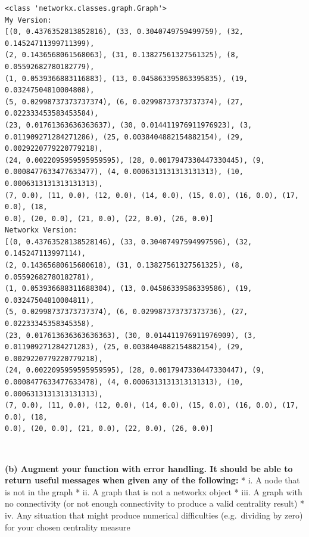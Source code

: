 \documentclass[11pt]{article}
\begin{document}
    \begin{Verbatim}[commandchars=\\\{\}]
<class 'networkx.classes.graph.Graph'>
My Version:
[(0, 0.4376352813852816), (33, 0.3040749759499759), (32, 0.14524711399711399),
(2, 0.1436568061568063), (31, 0.13827561327561325), (8, 0.05592682780182779),
(1, 0.0539366883116883), (13, 0.045863395863395835), (19, 0.03247504810004808),
(5, 0.02998737373737374), (6, 0.02998737373737374), (27, 0.022333453583453584),
(23, 0.01761363636363637), (30, 0.014411976911976923), (3,
0.011909271284271286), (25, 0.0038404882154882154), (29, 0.0029220779220779218),
(24, 0.0022095959595959595), (28, 0.0017947330447330445), (9,
0.0008477633477633477), (4, 0.0006313131313131313), (10, 0.0006313131313131313),
(7, 0.0), (11, 0.0), (12, 0.0), (14, 0.0), (15, 0.0), (16, 0.0), (17, 0.0), (18,
0.0), (20, 0.0), (21, 0.0), (22, 0.0), (26, 0.0)]
Networkx Version:
[(0, 0.43763528138528146), (33, 0.30407497594997596), (32, 0.145247113997114),
(2, 0.14365680615680618), (31, 0.13827561327561325), (8, 0.05592682780182781),
(1, 0.053936688311688304), (13, 0.04586339586339586), (19, 0.03247504810004811),
(5, 0.02998737373737374), (6, 0.029987373737373736), (27, 0.02233345358345358),
(23, 0.017613636363636363), (30, 0.014411976911976909), (3,
0.011909271284271283), (25, 0.0038404882154882154), (29, 0.0029220779220779218),
(24, 0.0022095959595959595), (28, 0.0017947330447330447), (9,
0.0008477633477633478), (4, 0.0006313131313131313), (10, 0.0006313131313131313),
(7, 0.0), (11, 0.0), (12, 0.0), (14, 0.0), (15, 0.0), (16, 0.0), (17, 0.0), (18,
0.0), (20, 0.0), (21, 0.0), (22, 0.0), (26, 0.0)]
    \end{Verbatim}

    \begin{center}
    \end{center}
    { \hspace*{\fill} \\}
    
    \textbf{(b) Augment your function with error handling. It should be able
to return useful} \textbf{messages when given any of the following:} *
i. A node that is not in the graph * ii. A graph that is not a networkx
object * iii. A graph with no connectivity (or not enough connectivity
to produce a valid centrality result) * iv. Any situation that might
produce numerical difficulties (e.g.~dividing by zero) for your chosen
centrality measure
\end{document}
